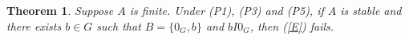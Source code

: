\documentclass[pdflatex,sn-apa,11pt]{sn-jnl}%
\newtheorem{theorem}{Theorem}%
\begin{document}

\begin{theorem}
\label{thm7}
Suppose $A$ is finite. Under (P1), (P3) and (P5), if $A$ is stable and there exists $b \in G$ such that $B = \{0_{G}, b\}$ and $bI0_{G}$, then (\ref{E}) fails.
\end{theorem}
\end{document}
